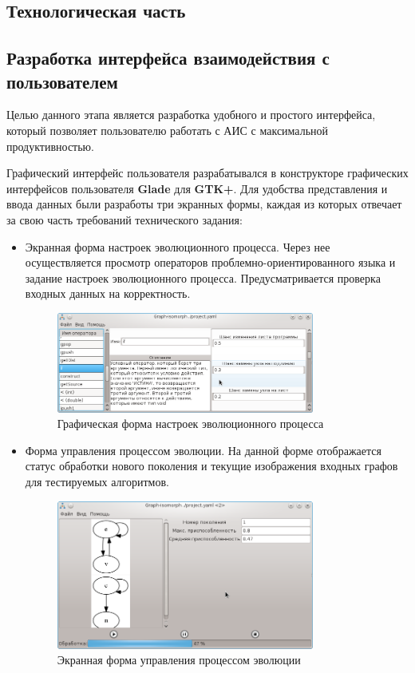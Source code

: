 \documentclass[russian,utf8,emptystyle]{eskdtext}
\begin{document}
\begin{spacing}{1.5}
\newpage
\subsection{Технологическая часть}
\subsection{Разработка интерфейса взаимодействия с пользователем}
Целью данного этапа является разработка удобного и простого интерфейса, который позволяет пользователю работать с АИС с максимальной продуктивностью.

Графический интерфейс пользователя разрабатывался в конструкторе графических интерфейсов пользователя \textbf{Glade} для \textbf{GTK+}. Для удобства представления и ввода данных были разработы три экранных формы, каждая из которых отвечает за свою часть требований технического задания:
\begin{itemize}
\item Экранная форма настроек эволюционного процесса. Через нее осуществляется просмотр операторов проблемно-ориентированного языка и задание настроек эволюционного процесса. Предусматривается проверка входных данных на корректность.
\begin{figure}[h!]
\centering
\includegraphics[width=0.8\textwidth]{screen07}
\caption{Графическая форма настроек эволюционного процесса}
\end{figure}

\item Форма управления процессом эволюции. На данной форме отображается статус обработки нового поколения и текущие изображения входных графов для тестируемых алгоритмов.
\begin{figure}[h!]
\centering
\includegraphics[width=0.8\textwidth]{screen09}
\caption{Экранная форма управления процессом эволюции}
\end{figure}



\end{itemize}
\end{spacing}
\end{document}
